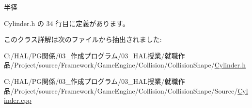 半径 



 Cylinder.\+h の 34 行目に定義があります。



このクラス詳解は次のファイルから抽出されました\+:\begin{DoxyCompactItemize}
\item 
C\+:/\+H\+A\+L/\+P\+G関係/03\+\_\+作成プログラム/03\+\_\+\+H\+A\+L授業/就職作品/\+Project/source/\+Framework/\+Game\+Engine/\+Collision/\+Collision\+Shape/\mbox{\hyperlink{_cylinder_8h}{Cylinder.\+h}}\item 
C\+:/\+H\+A\+L/\+P\+G関係/03\+\_\+作成プログラム/03\+\_\+\+H\+A\+L授業/就職作品/\+Project/source/\+Framework/\+Game\+Engine/\+Collision/\+Collision\+Shape/\+Source/\mbox{\hyperlink{_cylinder_8cpp}{Cylinder.\+cpp}}\end{DoxyCompactItemize}
